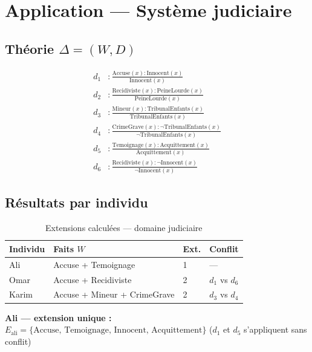\section{Application — Système judiciaire}

\subsection{Théorie $\Delta = (W, D)$}

\begin{tcolorbox}[defbox, title={Défauts $D$ — domaine judiciaire}]
\begin{align*}
d_1 &: \frac{\text{Accuse}(x) : \text{Innocent}(x)}{\text{Innocent}(x)} \\[4pt]
d_2 &: \frac{\text{Recidiviste}(x) : \text{PeineLourde}(x)}{\text{PeineLourde}(x)} \\[4pt]
d_3 &: \frac{\text{Mineur}(x) : \text{TribunalEnfants}(x)}{\text{TribunalEnfants}(x)} \\[4pt]
d_4 &: \frac{\text{CrimeGrave}(x) : \lnot\text{TribunalEnfants}(x)}{\lnot\text{TribunalEnfants}(x)} \\[4pt]
d_5 &: \frac{\text{Temoignage}(x) : \text{Acquittement}(x)}{\text{Acquittement}(x)} \\[4pt]
d_6 &: \frac{\text{Recidiviste}(x) : \lnot\text{Innocent}(x)}{\lnot\text{Innocent}(x)}
\end{align*}
\end{tcolorbox}

\subsection{Résultats par individu}

\begin{table}[H]
\centering
\caption{Extensions calculées — domaine judiciaire}
\begin{tabularx}{\linewidth}{lXll}
\toprule
\textbf{Individu} & \textbf{Faits $W$} & \textbf{Ext.} & \textbf{Conflit} \\
\midrule
Ali   & Accuse + Temoignage & 1 & — \\
Omar  & Accuse + Recidiviste & 2 & $d_1$ vs $d_6$ \\
Karim & Accuse + Mineur + CrimeGrave & 2 & $d_3$ vs $d_4$ \\
\bottomrule
\end{tabularx}
\end{table}

\noindent\textbf{Ali — extension unique :}
$E_{\text{ali}} = \{\text{Accuse, Temoignage, Innocent, Acquittement}\}$
\quad ($d_1$ et $d_5$ s'appliquent sans conflit)

